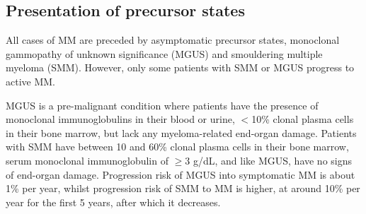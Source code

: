 \subsection{Presentation of precursor states}
All cases of MM are preceded by asymptomatic precursor states, monoclonal gammopathy of unknown significance (MGUS) and smouldering multiple myeloma (SMM).
However, only some patients with SMM or MGUS progress to active MM.

MGUS is a pre-malignant condition where patients have the presence of monoclonal immunoglobulins in their blood or urine, $<$10\% clonal plasma cells in their bone marrow, but lack any myeloma-related end-organ damage\cite{van2018mgus}.
Patients with SMM have between 10 and 60\% clonal plasma cells in their bone marrow, serum monoclonal immunoglobulin of $\ge$3 g/dL, and like MGUS, have no signs of end-organ damage\cite{rajkumar2015smoldering}.
Progression risk of MGUS into symptomatic MM is about 1\% per year, whilst progression risk of SMM to MM is higher, at around 10\% per year for the first 5 years, after which it decreases\cite{korde2011monoclonal, kyle2007clinical}.
%

